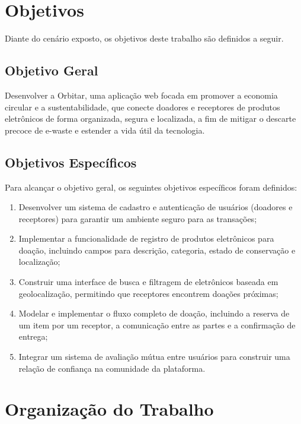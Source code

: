 \documentclass[
	12pt,				%
	openright,			%
	oneside,			%
	a4paper,			%
	english,			%
	brazil				%
	]{abntex2}
\theoremstyle{definition}
\begin{document}
\section[Objetivos]{Objetivos}

Diante do cenário exposto, os objetivos deste trabalho são definidos a seguir.

\subsection[Objetivo Geral]{Objetivo Geral}

Desenvolver a Orbitar, uma aplicação web focada em promover a economia circular e a sustentabilidade, que conecte doadores e receptores de produtos eletrônicos de forma organizada, segura e localizada, a fim de mitigar o descarte precoce de e-waste e estender a vida útil da tecnologia.

\subsection[Objetivos Específicos]{Objetivos Específicos}

Para alcançar o objetivo geral, os seguintes objetivos específicos foram definidos:

\begin{enumerate}[label={\alph*}]
    \item Desenvolver um sistema de cadastro e autenticação de usuários (doadores e receptores) para garantir um ambiente seguro para as transações;
    \item Implementar a funcionalidade de registro de produtos eletrônicos para doação, incluindo campos para descrição, categoria, estado de conservação e localização;
    \item Construir uma interface de busca e filtragem de eletrônicos baseada em geolocalização, permitindo que receptores encontrem doações próximas;
    \item Modelar e implementar o fluxo completo de doação, incluindo a reserva de um item por um receptor, a comunicação entre as partes e a confirmação de entrega;
    \item Integrar um sistema de avaliação mútua entre usuários para construir uma relação de confiança na comunidade da plataforma.
\end{enumerate}
\section[Organização do Trabalho]{Organização do Trabalho}
\end{document}
